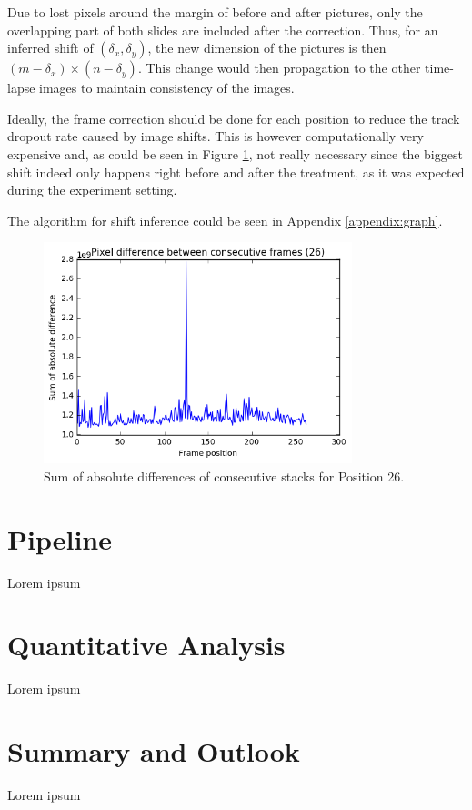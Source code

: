 \documentclass[pdftex,12pt,a4paper]{report}
\begin{document}
Due to lost pixels around the margin of before and after pictures, only the overlapping part of both slides are included after the correction. Thus, for an inferred shift of $(\delta_x, \delta_y)$, the new dimension of the pictures is then $(m - \delta_x) \times (n - \delta_y)$. This change would then propagation to the other time-lapse images to maintain consistency of the images.

Ideally, the frame correction should be done for each position to reduce the track dropout rate caused by image shifts. This is however computationally very expensive and, as could be seen in Figure \ref{fig:pixdiff}, not really necessary since the biggest shift indeed only happens right before and after the treatment, as it was expected during the experiment setting.

The algorithm for shift inference could be seen in Appendix \ref{appendix:graph}.

\begin{figure}[h]
\centering
\includegraphics[width=0.8\textwidth]{pixdiff}
\caption{Sum of absolute differences of consecutive stacks for Position 26.}
\label{fig:pixdiff}
\end{figure}

\chapter{Pipeline}
Lorem ipsum

\chapter{Quantitative Analysis}
Lorem ipsum

\chapter{Summary and Outlook}
Lorem ipsum
\end{document}
